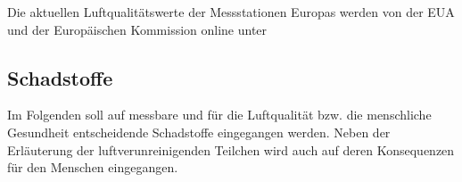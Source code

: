\begin{table}[H]
	\begin{center}
	\end{center}
	\caption{Wirkung der CO2-Konzentration auf den Menschen}
\end{table}

Die aktuellen Luftqualitätswerte der Messstationen Europas werden von der EUA und der Europäischen Kommission online unter 
\subsection{Schadstoffe}
Im Folgenden soll auf messbare und für die Luftqualität bzw. die menschliche Gesundheit entscheidende Schadstoffe eingegangen werden. Neben der Erläuterung der luftverunreinigenden Teilchen wird auch auf deren Konsequenzen für den Menschen eingegangen. 
